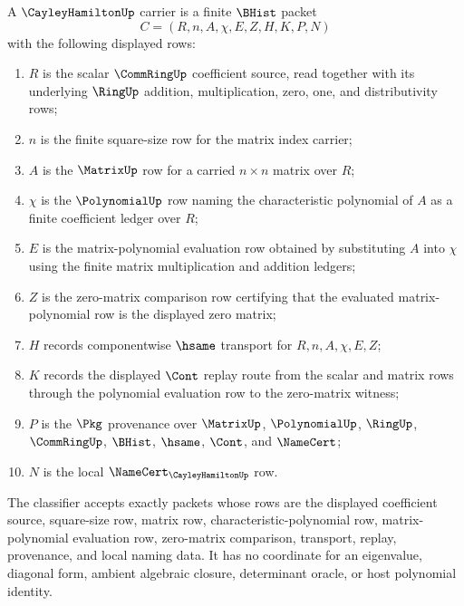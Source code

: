 \begin{definition}
\label{def:cayley-hamilton-carrier}
A $\CayleyHamiltonUp$ carrier is a finite $\BHist$ packet
$$
C=(R,n,A,\chi,E,Z,H,K,P,N)
$$
with the following displayed rows:
\begin{enumerate}
\item $R$ is the scalar $\CommRingUp$ coefficient source, read together with its underlying $\RingUp$ addition, multiplication, zero, one, and distributivity rows;
\item $n$ is the finite square-size row for the matrix index carrier;
\item $A$ is the $\MatrixUp$ row for a carried $n \times n$ matrix over $R$;
\item $\chi$ is the $\PolynomialUp$ row naming the characteristic polynomial of $A$ as a finite coefficient ledger over $R$;
\item $E$ is the matrix-polynomial evaluation row obtained by substituting $A$ into $\chi$ using the finite matrix multiplication and addition ledgers;
\item $Z$ is the zero-matrix comparison row certifying that the evaluated matrix-polynomial row is the displayed zero matrix;
\item $H$ records componentwise $\hsame$ transport for $R,n,A,\chi,E,Z$;
\item $K$ records the displayed $\Cont$ replay route from the scalar and matrix rows through the polynomial evaluation row to the zero-matrix witness;
\item $P$ is the $\Pkg$ provenance over $\MatrixUp$, $\PolynomialUp$, $\RingUp$, $\CommRingUp$, $\BHist$, $\hsame$, $\Cont$, and $\NameCert$;
\item $N$ is the local $\NameCert_{\CayleyHamiltonUp}$ row.
\end{enumerate}
The classifier accepts exactly packets whose rows are the displayed coefficient source, square-size row, matrix row, characteristic-polynomial row, matrix-polynomial evaluation row, zero-matrix comparison, transport, replay, provenance, and local naming data. It has no coordinate for an eigenvalue, diagonal form, ambient algebraic closure, determinant oracle, or host polynomial identity.
\end{definition}

